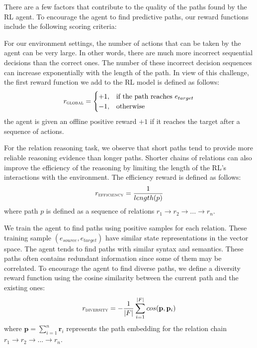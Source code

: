 \documentclass[11pt,letterpaper]{article}
\begin{document}
 There are a few factors that contribute to the quality of the paths found by the RL agent. To encourage the agent to find predictive paths, our reward functions include the following scoring criteria:

For our environment settings, the number of actions that can be taken by the agent can be very large. In other words, there are much more incorrect sequential decisions than the correct ones. The number of these incorrect decision sequences can increase exponentially with the length of the path. In view of this challenge, the first reward function we add to the RL model is defined as follows:
\begin{equation*}
r_{\textsc{global}} = \begin{cases}
+1,& \text{if the path reaches } e_{target}\\ 
-1,& \text{otherwise}
\end{cases}
\end{equation*}
the agent is given an offline positive reward $+1$ if it reaches the target after a sequence of actions.

 For the relation reasoning task, we observe that short paths tend to provide more reliable reasoning evidence than longer paths. Shorter chains of relations can also improve the efficiency of the reasoning by limiting the length of the RL's interactions with the environment. The efficiency reward is defined as follows:
\begin{equation*}
r_{\textsc{efficiency}} = \frac{1}{length(p)}
\end{equation*}
where path $p$ is defined as a sequence of relations $r_1 \rightarrow r_2 \rightarrow ... \rightarrow r_n$.

 We train the agent to find paths using positive samples for each relation. These training sample $(e_{source},e_{target})$ have similar state representations in the vector space. The agent tends to find paths with similar syntax and semantics. These paths often contains redundant information since some of them may be correlated. To encourage the agent to find diverse paths, we define a diversity reward function using the cosine similarity between the current path and the existing ones:
\begin{equation*}
r_{\textsc{diversity}} = -\frac{1}{|F|}\sum_{i=1}^{|F|}cos(\mathbf{p},\mathbf{p}_i)
\end{equation*}
where $\mathbf{p}=\sum_{i=1}^n\mathbf{r}_i$ represents the path embedding for the relation chain $r_1 \rightarrow r_2 \rightarrow ... \rightarrow r_n$. 
\end{document}
